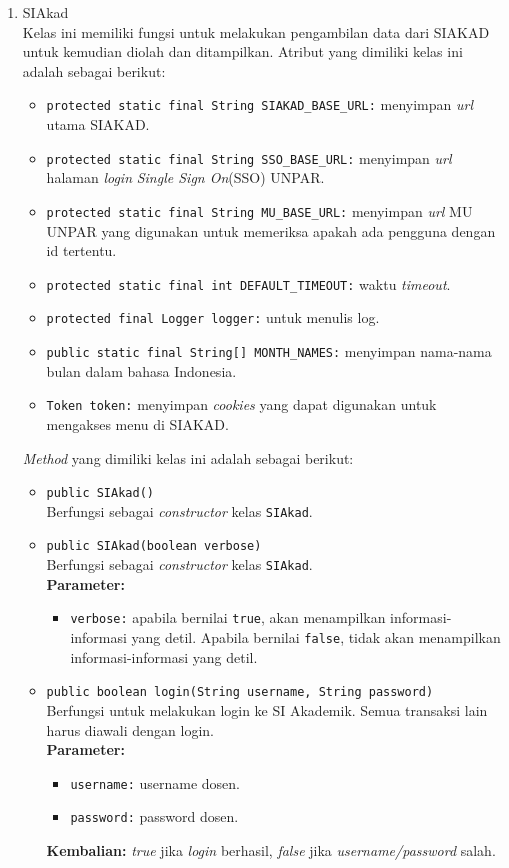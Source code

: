 \begin{enumerate}
\item{SIAkad}\\
Kelas ini memiliki fungsi untuk melakukan pengambilan data dari SIAKAD untuk kemudian diolah dan ditampilkan. Atribut yang dimiliki kelas ini adalah sebagai berikut:
	\begin{itemize}
        \item \texttt{protected static final String SIAKAD\_BASE\_URL:} menyimpan \textit{url} utama SIAKAD.
        \item \texttt{protected static final String SSO\_BASE\_URL:} menyimpan \textit{url} halaman \textit{login} \textit{Single Sign On}(SSO) UNPAR.
        \item \texttt{protected static final String MU\_BASE\_URL:} menyimpan \textit{url} MU UNPAR yang digunakan untuk memeriksa apakah ada pengguna dengan id tertentu.
        \item \texttt{protected static final int DEFAULT\_TIMEOUT:} waktu \textit{timeout}.
        \item \texttt{protected final Logger logger:} untuk menulis log.
        \item \texttt{public static final String[] MONTH\_NAMES:} menyimpan nama-nama bulan dalam bahasa Indonesia.
        \item \texttt{Token token:} menyimpan \textit{cookies} yang dapat digunakan untuk mengakses menu di SIAKAD.
    \end{itemize}
    
	\textit{Method} yang dimiliki kelas ini adalah sebagai berikut:
	\begin{itemize}
	    \item \texttt{public SIAkad()}\\
	    Berfungsi sebagai \textit{constructor} kelas \texttt{SIAkad}.
	    
	    \item \texttt{public SIAkad(boolean verbose)}\\
	    Berfungsi sebagai \textit{constructor} kelas \texttt{SIAkad}.\\
	    \textbf{Parameter:}
		\begin{itemize}
			\item \texttt{verbose:} apabila bernilai \texttt{true}, akan menampilkan informasi-informasi yang detil. Apabila bernilai \texttt{false}, tidak akan menampilkan informasi-informasi yang detil.
		\end{itemize}
		
	    \item \texttt{public boolean login(String username, String password)}\\
	    Berfungsi untuk melakukan login ke SI Akademik. Semua transaksi lain harus diawali dengan login.\\
	    \textbf{Parameter:}
		\begin{itemize}
			\item \texttt{username:} username dosen.
			\item \texttt{password:} password dosen.
		\end{itemize}
        \textbf{Kembalian:} \textit{true} jika \textit{login} berhasil, \textit{false} jika \textit{username/password} salah.
        

\end{itemize}
\end{enumerate}
